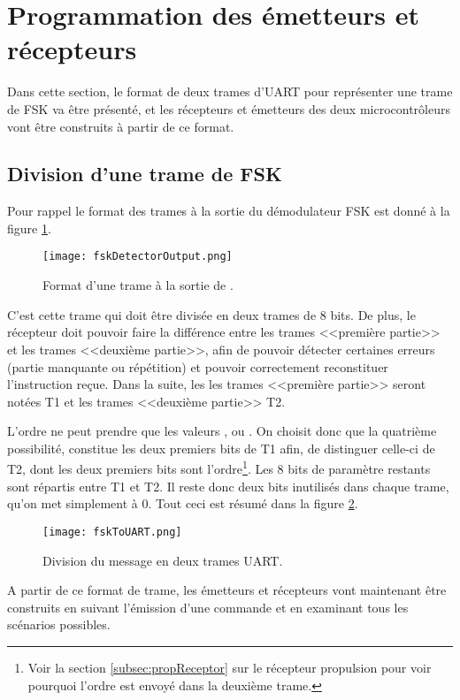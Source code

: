 \section{Programmation des émetteurs et récepteurs}
Dans cette section, le format de deux trames d'UART pour représenter une trame de FSK va être présenté, et les récepteurs et émetteurs des deux microcontrôleurs vont être construits à partir de ce format.

\subsection{Division d'une trame de FSK}
Pour rappel le format des trames à la sortie du démodulateur FSK est donné à la figure \ref{fig:fskDetectorOutput}.
\begin{figure}[htbp]
  \centering
  \texttt{[image: fskDetectorOutput.png]}
  \caption{Format d'une trame à la sortie de .\label{fig:fskDetectorOutput}}
\end{figure}
C'est cette trame qui doit être divisée en deux trames de 8 bits. De plus, le récepteur doit pouvoir faire la différence entre les trames <<première partie>> et les trames <<deuxième partie>>, afin de pouvoir détecter certaines erreurs (partie manquante ou répétition) et pouvoir correctement reconstituer l'instruction reçue. Dans la suite, les les trames <<première partie>> seront notées T1 et les trames <<deuxième partie>> T2.

L'ordre ne peut prendre que les valeurs ,  ou . On choisit donc que la quatrième possibilité,  constitue les deux premiers bits de T1 afin, de distinguer celle-ci de T2, dont les deux premiers bits sont l'ordre\footnote{Voir la section \ref{subsec:propReceptor} sur le récepteur propulsion pour voir pourquoi l'ordre est envoyé dans la deuxième trame.}. Les 8 bits de paramètre restants sont répartis entre T1 et T2. Il reste donc deux bits inutilisés dans chaque trame, qu'on met simplement à 0. Tout ceci est résumé dans la figure \ref{fig:fskToUART}.
\begin{figure}[htbp]
  \centering
  \texttt{[image: fskToUART.png]}
  \caption{Division du message en deux trames UART.\label{fig:fskToUART}}
\end{figure}

A partir de ce format de trame, les émetteurs et récepteurs vont maintenant être construits en suivant l'émission d'une commande et en examinant tous les scénarios possibles.


